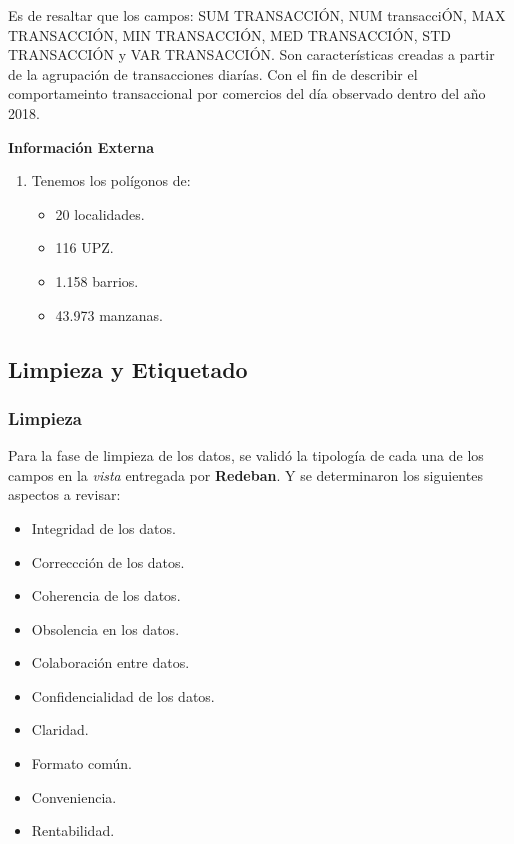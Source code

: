 \documentclass[a4paper]{article}
\begin{document}
Es de resaltar que los campos: SUM TRANSACCIÓN, NUM transacciÓN, MAX TRANSACCIÓN, MIN TRANSACCIÓN, MED TRANSACCIÓN, STD TRANSACCIÓN y VAR TRANSACCIÓN. Son características
creadas a partir de la agrupación de transacciones diarías. Con el fin de describir el comportameinto transaccional por comercios del día observado dentro del año 2018.

\textbf{Información Externa}

\begin{enumerate}
	\item Tenemos los polígonos de:
	\begin{itemize}
		\item 20 localidades.
		\item 116 UPZ.
		\item 1.158 barrios.
		\item 43.973 manzanas.
	\end{itemize}
\end{enumerate}

\subsection{Limpieza y Etiquetado}
\subsubsection{Limpieza}

Para la fase de limpieza de los datos, se validó la tipología de cada una de los campos en la \textit{vista} entregada por \textbf{Redeban}.
Y se determinaron los siguientes aspectos a revisar:
\begin{multicols}{2}
	\begin{itemize}
		\item Integridad de los datos.
		\item Correccción de los datos.
		\item Coherencia de los datos.
		\item Obsolencia en los datos.
		\item Colaboración entre datos.
		\item Confidencialidad de los datos.
		\item Claridad.
		\item Formato común.
		\item Conveniencia.
		\item Rentabilidad.
	\end{itemize}
\end{multicols}
\end{document}
